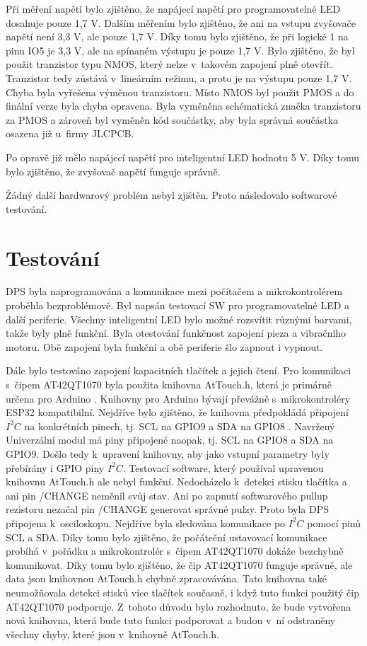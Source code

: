 Při měření napětí bylo zjištěno, že napájecí napětí pro programovatelné LED dosahuje pouze 1,7 V. Dalším měřením bylo zjištěno, že ani na vstupu zvyšovače napětí není 3,3 V, ale 
pouze 1,7 V. Díky tomu bylo zjištěno, že při logické 1 na pinu IO5 je 3,3 V, ale na spínaném výstupu je pouze 1,7 V. Bylo zjištěno, že byl použit tranzistor typu NMOS, který nelze 
v~takovém zapojení plně otevřít. Tranzistor tedy zůstává v~lineárním režimu, a proto je na výstupu pouze 1,7 V. Chyba byla vyřešena výměnou tranzistoru. Místo NMOS byl použit PMOS 
a do finální verze byla chyba opravena. Byla vyměněna schématická značka tranzistoru za PMOS a zároveň byl vyměněn kód součástky, aby byla správná součástka osazena již u~firmy JLCPCB. 

Po opravě již mělo napájecí napětí pro inteligentní LED hodnotu 5 V. Díky tomu bylo zjištěno, že zvyšovač napětí funguje správně. 

Žádný další hardwarový problém nebyl zjištěn. Proto následovalo softwarové testování. 

\section{Testování}
DPS byla naprogramována a komunikace mezi počítačem a mikrokontrolérem proběhla bezproblémově. Byl napsán testovací SW pro programovatelné LED 
a další periferie. Všechny inteligentní LED bylo možné rozsvítit různými barvami, takže byly plně funkční. Byla otestování funkčnost 
zapojení pieza a vibračního motoru. Obě zapojení byla funkční a obě periferie šlo zapnout i vypnout. 

Dále bylo testováno zapojení kapacitních tlačítek a jejich čtení. Pro komunikaci s~čipem AT42QT1070 byla použita knihovna AtTouch.h, která je primárně určena pro Arduino \cite{AtTouch}. 
Knihovny pro Arduino bývají převážně s~mikrokontroléry ESP32 kompatibilní. Nejdříve bylo zjištěno, že knihovna předpokládá připojení $I^2C$ na konkrétních pinech, tj. SCL na GPIO9 a SDA 
na GPIO8 \cite{AtTouch}. Navržený Univerzální modul má piny připojené naopak, tj. SCL na GPIO8 a SDA na GPIO9. Došlo tedy k~upravení knihovny, aby jako vstupní parametry byly přebírány i GPIO 
piny $I^2C$. Testovací software, který používal upravenou knihovnu AtTouch.h ale nebyl funkční. Nedocházelo k~detekci stisku tlačítka a ani pin /CHANGE neměnil svůj stav. Ani po zapnutí 
softwarového pullup rezistoru nezačal pin /CHANGE generovat správné pulzy. Proto byla DPS 
připojena k~osciloskopu. Nejdříve byla sledována komunikace po $I^2C$ pomocí pinů SCL a SDA. Díky tomu bylo zjištěno, že počáteční ustavovací komunikace probíhá v~pořádku a mikrokontrolér 
s~čipem AT42QT1070 dokáže bezchybně komunikovat. Díky tomu bylo zjištěno, že čip AT42QT1070 funguje správně, ale data jsou knihovnou AtTouch.h chybně zpracovávána. Tato knihovna také neumožňovala detekci 
stisků více tlačítek současně, i když tuto funkci použitý čip AT42QT1070 podporuje. Z~tohoto důvodu bylo rozhodnuto, že bude vytvořena nová knihovna, která bude tuto funkci podporovat 
a budou v~ní odstraněny všechny chyby, které jsou v~knihovně AtTouch.h. 

